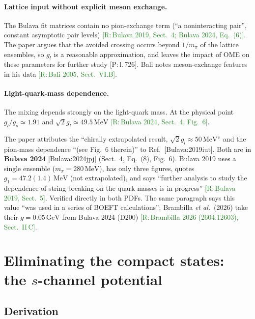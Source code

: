 \documentclass[11pt,a4paper]{article}
\newcommand{\tagP}[1]{\textcolor{blue!65!black}{\textsf{\small[P:\,#1]}}}
\newcommand{\tagR}[1]{\textcolor{ForestGreen}{\textsf{\small[R:\,#1]}}}
\newcommand{\GeV}{\,\mathrm{GeV}}
\newcommand{\MeV}{\,\mathrm{MeV}}
\begin{document}
\paragraph{Lattice input without explicit meson exchange.} The Bulava fit matrices contain no pion-exchange term (``a noninteracting pair'', constant asymptotic pair levels) \tagR{Bulava 2019, Sect.~4; Bulava 2024, Eq.~(6)}. The paper argues that the avoided crossing occurs beyond $1/m_\pi$ of the lattice ensembles, so $g_l$ is a reasonable approximation, and leaves the impact of OME on these parameters for further study \tagP{l.\,726}. Bali notes meson-exchange features in his data \tagR{Bali 2005, Sect.~VI.B}.

\paragraph{Light-quark-mass dependence.} The mixing depends strongly on the light-quark mass. At the physical point $g_l/g_s\simeq1.91$ and $\sqrt2g_l\simeq49.5\MeV$ \tagR{Bulava 2024, Sect.~4, Fig.~6}.

\begin{warnbox}
The paper attributes the ``chirally extrapolated result, $\sqrt2g_l\approx50\MeV$'' and the pion-mass dependence ``(see Fig.~6 therein)'' to Ref.~[Bulava:2019iut]. Both are in \textbf{Bulava 2024} [Bulava:2024jpj] (Sect.~4, Eq.~(8), Fig.~6). Bulava 2019 uses a single ensemble ($m_\pi=280\MeV$), has only three figures, quotes $g_1=47.2(1.4)\MeV$ (not extrapolated), and says ``further analysis to study the dependence of string breaking on the quark masses is in progress'' \tagR{Bulava 2019, Sect.~5}. Verified directly in both PDFs. The same paragraph says this value ``was used in a series of BOEFT calculations''; Brambilla \emph{et al.}\ (2026) take their $g=0.05\GeV$ from Bulava 2024 (D200) \tagR{Brambilla 2026 (2604.12603), Sect.~II\,C}.
\end{warnbox}

\section{Eliminating the compact states: the $s$-channel potential}
\label{sec:potential}

\subsection{Derivation}
\end{document}

